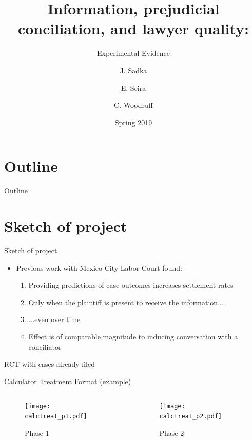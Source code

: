 \documentclass[8pt]{beamer}
\title{Information, prejudicial conciliation, and lawyer quality:}
\subtitle{Experimental Evidence}
\author{J. Sadka\inst{1} \and E. Seira\inst{2} \and C. Woodruff\inst{3}}
\institute[ITAM, Oxford] %
{
  \inst{1,2}%
  ITAM
  \and
  \inst{3}%
  Oxford
}
\date{Spring 2019}
\begin{document}
\begin{frame}
  \titlepage
\end{frame}

\section*{Outline}
\begin{frame}{Outline}
\tableofcontents
\end{frame}

\section{Sketch of project}
\begin{frame}{Sketch of project}
\begin{itemize}
    \item Previous work with Mexico City Labor Court found:
    \begin{enumerate}
        \item Providing predictions of case outcomes increases settlement rates
        \item Only when the plaintiff is present to receive the information...
        \item ...even over time
        \item Effect is of comparable magnitude to inducing conversation with a conciliator
    \end{enumerate}
\end{itemize}

RCT with cases already filed

\end{frame}



\begin{frame}{Calculator Treatment Format (example)}

\begin{columns}
\begin{column}{0.5\textwidth}
\begin{figure}[H]
    \caption{Phase 1}
    \label{calc_template_p1}
    \begin{center}
        \texttt{[image: calctreat\_p1.pdf]}
        \end{center}
\end{figure}
\end{column}
\begin{column}{0.5\textwidth}  %
  \begin{figure}[H]
    \caption{Phase 2}
    \label{calc_template_p2}
    \begin{center}
        \texttt{[image: calctreat\_p2.pdf]}
        \end{center}
\end{figure} 
\end{column}
\end{columns}




\end{frame}
\end{document}
